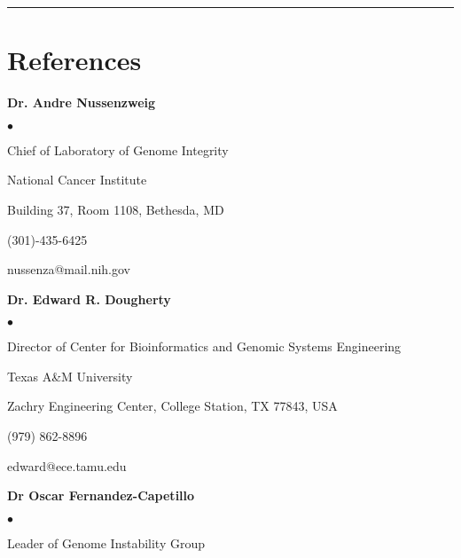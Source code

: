 \documentclass[12pt, centered, centered]{res_yy}
\newenvironment{list1}{
  \begin{list}{\ding{113}}{%
      \setlength{\itemsep}{0in}
      \setlength{\parsep}{0in} \setlength{\parskip}{0in}
      \setlength{\topsep}{0in} \setlength{\partopsep}{0in} 
      \setlength{\leftmargin}{0.17in}}}{\end{list}}
\newenvironment{list2}{
  \begin{list}{$\bullet$}{%
      \setlength{\itemsep}{0in}
      \setlength{\parsep}{0in} \setlength{\parskip}{0in}
      \setlength{\topsep}{0in} \setlength{\partopsep}{0in} 
      \setlength{\leftmargin}{0.2in}}}{\end{list}}
\begin{document}
\begin{resume}


\newpage
\vspace{.03in}
\rule{\linewidth}{0.1mm}
\section{\sc References} 
\begin{list1}
\item[] \textbf{Dr. Andre Nussenzweig}       
\begin{list2} 		
\item[]  Chief of Laboratory of Genome Integrity
\item[] National Cancer Institute
\item[] Building 37, Room 1108, Bethesda, MD
\item[] (301)-435-6425
\item[] nussenza@mail.nih.gov
\end{list2}
\vspace{.1in}
\item[] \textbf{Dr. Edward R. Dougherty}       
\begin{list2} 		
\item[] Director of Center for Bioinformatics and Genomic Systems Engineering
\item[] Texas A\&M University
\item[] Zachry Engineering Center, College Station, TX 77843, USA
\item[] (979) 862-8896
\item[] edward@ece.tamu.edu
\end{list2}
\vspace{.1in}
\item[] \textbf{Dr Oscar Fernandez-Capetillo}       
\begin{list2} 		
\item[] Leader of Genome Instability Group

\end{list2}
\end{list1}
\end{resume}
\end{document}
